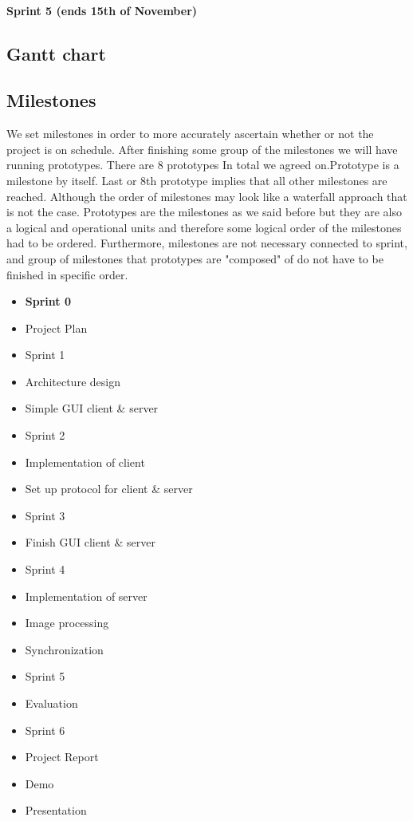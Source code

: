 \documentclass{article}
\begin{document}
\paragraph{Sprint 5 (ends 15th of November)}
\subsection{Gantt chart}

\subsection{Milestones}

We set milestones in order to more accurately ascertain whether or not the project is on schedule. After finishing some group of the milestones we will have running prototypes. There are 8 prototypes In total we 
agreed on.Prototype is a milestone by itself. Last or 8th prototype implies that all other milestones are reached. Although the order of milestones may look like a waterfall approach that is not the case.
Prototypes are the milestones as we said before but they are also a logical and operational units and therefore some logical order of the milestones had to be ordered. Furthermore, milestones are not 
necessary connected to sprint, and group of milestones that prototypes are "composed" of do not have to be finished in specific order.


\begin{itemize}
    \item \textbf{Sprint 0}
    \item Project Plan
    \item Sprint 1
    \item Architecture design
    \item Simple GUI client \& server
    \item Sprint 2
    \item Implementation of client
    \item Set up protocol for client \& server
    \item Sprint 3
    \item Finish GUI client \& server
    \item Sprint 4
    \item Implementation of server
        \item Image processing
        \item Synchronization
    \item Sprint 5
    \item Evaluation
    \item Sprint 6
    \item Project Report
    \item Demo
    \item Presentation
\end{itemize}
\end{document}
